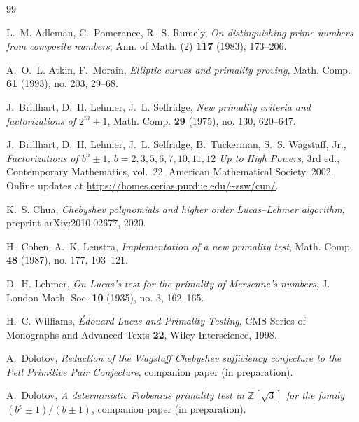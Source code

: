 \documentclass[11pt,a4paper]{amsart}
\theoremstyle{plain}
\theoremstyle{definition}
\newcommand{\Z}{\mathbb{Z}}
\begin{document}
\begin{thebibliography}{99}

L.~M. Adleman, C.~Pomerance, R.~S. Rumely,
\emph{On distinguishing prime numbers from composite numbers},
Ann. of Math. (2) \textbf{117} (1983), 173--206.

A.~O.~L. Atkin, F.~Morain,
\emph{Elliptic curves and primality proving},
Math. Comp. \textbf{61} (1993), no. 203, 29--68.

J.~Brillhart, D.~H. Lehmer, J.~L. Selfridge,
\emph{New primality criteria and factorizations of $2^m \pm 1$},
Math. Comp. \textbf{29} (1975), no. 130, 620--647.

J.~Brillhart, D.~H. Lehmer, J.~L. Selfridge, B.~Tuckerman, S.~S. Wagstaff, Jr.,
\emph{Factorizations of $b^n \pm 1$, $b = 2, 3, 5, 6, 7, 10, 11, 12$ Up to
High Powers}, 3rd ed., Contemporary Mathematics, vol.~22,
American Mathematical Society, 2002. Online updates at
\url{https://homes.cerias.purdue.edu/~ssw/cun/}.

K.~S. Chua,
\emph{Chebyshev polynomials and higher order Lucas--Lehmer algorithm},
preprint arXiv:2010.02677, 2020.

H.~Cohen, A.~K. Lenstra,
\emph{Implementation of a new primality test},
Math. Comp. \textbf{48} (1987), no. 177, 103--121.

D.~H. Lehmer,
\emph{On Lucas's test for the primality of Mersenne's numbers},
J. London Math. Soc. \textbf{10} (1935), no. 3, 162--165.

H.~C. Williams,
\emph{\'Edouard Lucas and Primality Testing},
CMS Series of Monographs and Advanced Texts \textbf{22},
Wiley-Interscience, 1998.

A.~Dolotov,
\emph{Reduction of the Wagstaff Chebyshev sufficiency conjecture to
the Pell Primitive Pair Conjecture},
companion paper (in preparation).

A.~Dolotov,
\emph{A deterministic Frobenius primality test in $\Z[\sqrt 3]$ for
the family $(b^p \pm 1)/(b \pm 1)$},
companion paper (in preparation).

\end{thebibliography}
\end{document}
